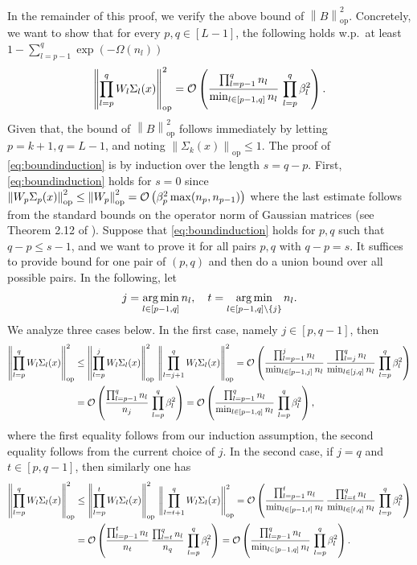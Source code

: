 \documentclass[11pt]{article}
\def\Set#1{\left\{ #1 \right\}}
\newcommand{\bigO}[1]{\mathcal{O}\left(#1\right)}
\newcommand{\bigOmg}[1]{\Omega\left(#1\right)}
\newcommand{\bigexp}[1]{\exp\left(#1\right)}
\newcommand{\norm}[1]{\left\|#1\right\|}
\def\GaussOpNorm{Theorem 2.12 of \cite{Davidson2001}}
\def\op{\mathrm{op}}
\def\argmin{\mathop{\rm arg\,min}\limits}
\def\min{\mathop{\rm min}\nolimits}
\def\max{\mathop{\rm max}\nolimits}
\begin{document}
    In the remainder of this proof, we verify the above bound of $\norm{B}_{\op}^2$. 
    Concretely, we want to show that for every $p,q\in[L-1]$, 
    the following holds w.p.\ at least $1-\sum_{l=p-1}^{q}\bigexp{-\bigOmg{n_l}}$
    \begin{align}\label{eq:boundinduction}
	\norm{\prod_{l=p}^{q} W_l\Sigma_l(x)}_{\op}^2
	=\bigO{ \frac{\prod_{l=p-1}^q n_l}{\min_{l\in[p-1,q]}n_l}\, \prod_{l=p}^{q}\beta_l^2} .
    \end{align}
    Given that, the bound of $\norm{B}_{\op}^2$ follows immediately by letting $p=k+1, q=L-1$, and noting $\norm{\Sigma_k(x)}_{\op}\leq 1.$
    The proof of \eqref{eq:boundinduction} is by induction over the length $s=q-p$.
    First, \eqref{eq:boundinduction} holds for $s=0$ 
    since $\norm{W_p\Sigma_p(x)}_{\op}^2\leq \norm{W_p}_{\op}^2 = \bigO{\beta_p^2\max(n_p,n_{p-1})}$ where the last estimate
    follows from the standard bounds on the operator norm of Gaussian matrices (see \GaussOpNorm).
    Suppose that \eqref{eq:boundinduction} holds for $p, q$ such that $q-p\le s-1$, 
    and we want to prove it for all pairs $p,q$ with $q-p=s$. 
    It suffices to provide bound for one pair of $(p,q)$ and then do a union bound over all possible pairs.
    In the following, let
    \begin{align*}
	j=\argmin_{l\in[p-1,q]} n_l, \quad t=\argmin_{l\in[p-1,q]\setminus\Set{j}} n_l.
    \end{align*}
    We analyze three cases below. In the first case,
    namely $j\in[p,q-1]$, then
    \begin{align*}
	\norm{\prod_{l=p}^{q} W_l\Sigma_l(x)}_{\op}^2
	&\leq\norm{\prod_{l=p}^{j} W_l\Sigma_l(x)}_{\op}^2\, \norm{\prod_{l=j+1}^{q} W_l\Sigma_l(x)}_{\op}^2
	=\bigO{ \frac{\prod_{l=p-1}^{j} n_l}{\min_{l\in[p-1,j]}n_l}\, \frac{\prod_{l=j}^q n_l}{\min_{l\in[j,q]}n_l}\, \prod_{l=p}^{q}\beta_l^2}\\
	&=\bigO{ \frac{\prod_{l=p-1}^q n_l}{n_j}\, \prod_{l=p}^{q}\beta_l^2 }
	=\bigO{ \frac{\prod_{l=p-1}^q n_l}{\min_{l\in[p-1,q]}n_l}\, \prod_{l=p}^{q}\beta_l^2 },
    \end{align*}
    where the first equality follows from our induction assumption, the second equality follows from the current choice of $j.$
    In the second case, if $j=q$ and $t\in[p,q-1]$, then similarly one has
    \begin{align*}
	\norm{\prod_{l=p}^{q} W_l\Sigma_l(x)}_{\op}^2
	&\leq\norm{\prod_{l=p}^{t} W_l\Sigma_l(x)}_{\op}^2\, \norm{\prod_{l=t+1}^{q} W_l\Sigma_l(x)}_{\op}^2
	=\bigO{ \frac{\prod_{l=p-1}^{t} n_l}{\min_{l\in[p-1,t]}n_l}\, \frac{\prod_{l=t}^q n_l}{\min_{l\in[t,q]}n_l}\, \prod_{l=p}^{q}\beta_l^2 }\\
	&=\bigO{ \frac{\prod_{l=p-1}^{t} n_l}{n_t}\, \frac{\prod_{l=t}^q n_l}{n_q}\, \prod_{l=p}^{q}\beta_l^2 }
	=\bigO{ \frac{\prod_{l=p-1}^q n_l}{\min_{l\in[p-1,q]}n_l}\, \prod_{l=p}^{q}\beta_l^2 } .
    \end{align*}
\end{document}
